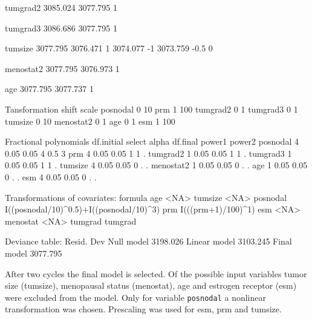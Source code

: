 \documentclass[11pt]{article}
\begin{document}
\begin{Schunk}
\begin{Soutput}
	tumgrad2	 	 	 
	        	3085.024	 
	        	3077.795	1
	        			 		
	        			 		

	tumgrad3	 	 	 
	        	3086.686	 
	        	3077.795	1
	        			 		
	        			 		

	tumsize	 	 	 	 
	        	3077.795	 
	        	3076.471	1
	        	3074.077	-1
	        	3073.759	-0.5 0

	menostat2	 	 	 
	        	3077.795	 
	        	3076.973	1
	        			 		
	        			 		

	age	 	 	 	 
	        	3077.795	 
	        	3077.737	1
	        			 		
	        			 		


Tansformation
          shift scale
posnodal      0    10
prm           1   100
tumgrad2      0     1
tumgrad3      0     1
tumsize       0    10
menostat2     0     1
age           0     1
esm           1   100

Fractional polynomials
          df.initial select alpha df.final power1 power2
posnodal           4   0.05  0.05        4    0.5      3
prm                4   0.05  0.05        1      1      .
tumgrad2           1   0.05  0.05        1      1      .
tumgrad3           1   0.05  0.05        1      1      .
tumsize            4   0.05  0.05        0      .      .
menostat2          1   0.05  0.05        0      .      .
age                1   0.05  0.05        0      .      .
esm                4   0.05  0.05        0      .      .


Transformations of covariates:
                                         formula
age                                         <NA>
tumsize                                     <NA>
posnodal I((posnodal/10)^0.5)+I((posnodal/10)^3)
prm                           I(((prm+1)/100)^1)
esm                                         <NA>
menostat                                    <NA>
tumgrad                                  tumgrad


Deviance table:
 		 Resid. Dev
Null model	 3198.026
Linear model	 3103.245
Final model	 3077.795
\end{Soutput}
\end{Schunk}

After two cycles the final model is selected. 
Of the possible input variables tumor size (tumsize), menopausal status (menostat), age and estrogen receptor (esm) were excluded from the model.
Only for variable \texttt{posnodal} a nonlinear transformation was chosen. 
Prescaling was used for esm, prm and tumsize.
\end{document}
